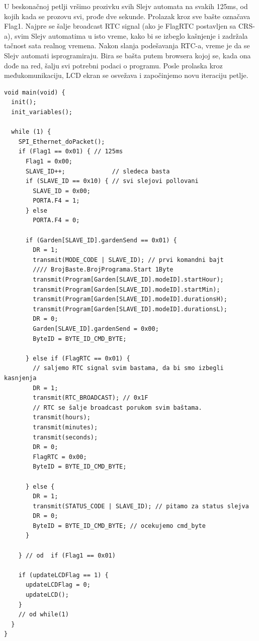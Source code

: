 \documentclass[12pt]{article}
\numberwithin{figure}{section}
\begin{document}
U beskonačnoj petlji vršimo prozivku svih Slejv automata na svakih 125ms, od kojih kada se prozovu svi, prođe dve sekunde. Prolazak kroz sve bašte označava Flag1.
Najpre se šalje broadcast RTC signal (ako je FlagRTC postavljen sa CRS-a), svim Slejv automatima u isto vreme, kako bi se izbeglo kašnjenje i zadržala tačnost sata realnog vremena.
Nakon slanja podešavanja RTC-a, vreme je da se Slejv automati isprogramiraju. Bira se bašta putem browsera kojoj se, kada ona dođe na red, šalju svi potrebni podaci o programu.
Posle prolaska kroz međukomunikaciju, LCD ekran se osvežava i započinjemo novu iteraciju petlje.
\begin{verbatim}
void main(void) {
  init();
  init_variables();

  while (1) {
    SPI_Ethernet_doPacket();
    if (Flag1 == 0x01) { // 125ms
      Flag1 = 0x00;
      SLAVE_ID++;             // sledeca basta
      if (SLAVE_ID == 0x10) { // svi slejovi pollovani
        SLAVE_ID = 0x00;
        PORTA.F4 = 1;
      } else
        PORTA.F4 = 0;

      if (Garden[SLAVE_ID].gardenSend == 0x01) {
        DR = 1;
        transmit(MODE_CODE | SLAVE_ID); // prvi komandni bajt
        //// BrojBaste.BrojPrograma.Start 1Byte
        transmit(Program[Garden[SLAVE_ID].modeID].startHour);
        transmit(Program[Garden[SLAVE_ID].modeID].startMin);
        transmit(Program[Garden[SLAVE_ID].modeID].durationsH);
        transmit(Program[Garden[SLAVE_ID].modeID].durationsL);
        DR = 0;
        Garden[SLAVE_ID].gardenSend = 0x00;
        ByteID = BYTE_ID_CMD_BYTE;

      } else if (FlagRTC == 0x01) {
        // saljemo RTC signal svim bastama, da bi smo izbegli kasnjenja
        DR = 1;
        transmit(RTC_BROADCAST); // 0x1F
        // RTC se šalje broadcast porukom svim baštama.
        transmit(hours);
        transmit(minutes);
        transmit(seconds);
        DR = 0;
        FlagRTC = 0x00;
        ByteID = BYTE_ID_CMD_BYTE;

      } else {
        DR = 1;
        transmit(STATUS_CODE | SLAVE_ID); // pitamo za status slejva
        DR = 0;
        ByteID = BYTE_ID_CMD_BYTE; // ocekujemo cmd_byte
      }

    } // od  if (Flag1 == 0x01)

    if (updateLCDFlag == 1) {
      updateLCDFlag = 0;
      updateLCD();
    }
    // od while(1)
  }
}
\end{verbatim}


\clearpage
\end{document}

